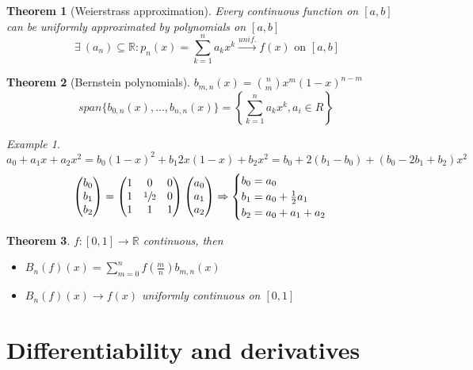 \documentclass{article}
\newcommand{\DS}{\displaystyle}
\newcommand{\Ar}{\Rightarrow}
\newcommand{\f}[3]{#1 : #2 \rightarrow #3}
\newcommand{\intcc}[1]{\left[#1\right]}
\newcommand{\tounif}{\xrightarrow{unif.}}
\theoremstyle{definition}
\theoremstyle{definition}
\theoremstyle{plain}
\newtheorem{theorem}{Theorem}[section]
\theoremstyle{plain}
\theoremstyle{plain}
\theoremstyle{plain}
\theoremstyle{definition}
\theoremstyle{remark}
\theoremstyle{remark}
\theoremstyle{remark}
\newtheorem{examplet}{Example}[theorem]
\theoremstyle{remark}
\newcommand{\R}{\mathbb{R}}
\newcommand{\sumn}{\sum_{k=1}^n}
\newcommand{\Exists}{\ \exists \ }
\newcommand{\vecThree}[3]{\begin{pmatrix}#1\\#2\\#3\end{pmatrix}}
\begin{document}
\begin{theorem}[Weierstrass approximation]
  Every continuous function on $\intcc{a,b}$ can be uniformly approximated by polynomials on $\intcc{a,b}$
  \[
  \Exists (a_n) \subseteq \R : p_n(x) = \sumn a_k x^k \tounif f(x) \text{ on } \intcc{a,b}
  \]
\end{theorem}


\begin{theorem}[Bernstein polynomials]
  $b_{m,n}(x) = \binom{n}{m} x^m (1-x)^{n-m}$
  \[
  span \{ b_{0,n}(x), \hdots, b_{n,n}(x) \} =
  \left\{ \sumn a_k x^k, a_i \in R \right\}
  \]
\end{theorem}

\begin{examplet}
  \[
  a_0 + a_1x + a_2 x^2 = b_0 (1 - x)^2 + b_1 2x (1-x) + b_2 x^2 =
  b_0 + 2 (b_1 - b_0) + (b_0 - 2b_1 + b_2) x^2
  \]
  \[
  \vecThree{b_0}{b_1}{b_2} =
  \begin{pmatrix}
    1 & 0 & 0 \\
    1 & \sfrac{1}{2} & 0 \\
    1 & 1 & 1
  \end{pmatrix} \vecThree{a_0}{a_1}{a_2} \Ar
  \begin{cases}
    b_0 = a_0 \\
    b_1 = a_0 + \frac{1}{2} a_1 \\
    b_2 = a_0 + a_1 + a_2
  \end{cases}
  \]
\end{examplet}


\begin{theorem}
  $\f{f}{\intcc{0,1}}{\R}$ continuous, then
  \begin{itemize}
  \item $\DS B_n(f)(x) = \sum_{m=0}^{n} f(\frac{m}{n}) b_{m,n}(x)$
  \item $B_n(f)(x) \to f(x)$ uniformly continuous on $\intcc{0,1}$
  \end{itemize}
\end{theorem}


\newpage
\section{Differentiability and derivatives}
\end{document}
